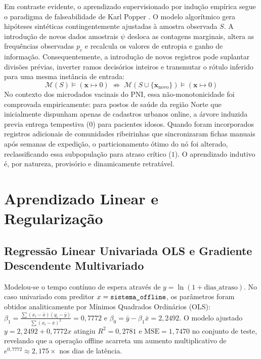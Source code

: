 \documentclass[12pt]{article}
\begin{document}
Em contraste evidente, o aprendizado supervisionado por indução empírica segue o paradigma de falseabilidade de Karl Popper \cite{popper1959}. O modelo algorítmico gera hipóteses sintéticas contingentemente ajustadas à amostra observada $S$. A introdução de novos dados amostrais $\psi$ desloca as contagens marginais, altera as frequências observadas $p_c$ e recalcula os valores de entropia e ganho de informação. Consequentemente, a introdução de novos registros pode suplantar divisões prévias, inverter ramos decisórios inteiros e transmutar o rótulo inferido para uma mesma instância de entrada:
\begin{equation}
\mathcal{M}(S) \models (\mathbf{x} \mapsto 0) \;\not\Longrightarrow\; \mathcal{M}(S \cup \{\mathbf{x}_{\text{novo}}\}) \models (\mathbf{x} \mapsto 0)
\end{equation}
No contexto dos microdados vacinais do PNI, essa não-monotonicidade foi comprovada empiricamente: para postos de saúde da região Norte que inicialmente dispunham apenas de cadastros urbanos online, a árvore induzida previa entrega tempestiva ($0$) para pacientes idosos. Quando foram incorporados registros adicionais de comunidades ribeirinhas que sincronizaram fichas manuais após semanas de expedição, o particionamento ótimo do nó foi alterado, reclassificando essa subpopulação para atraso crítico ($1$). O aprendizado indutivo é, por natureza, provisório e dinamicamente retratável.

\section{Aprendizado Linear e Regularização}

\subsection{Regressão Linear Univariada OLS e Gradiente Descendente Multivariado}

Modelou-se o tempo contínuo de espera através de $y = \ln(1 + \text{dias\_atraso})$. No caso univariado com preditor $x = \text{\texttt{sistema\_offline}}$, os parâmetros foram obtidos analiticamente por Mínimos Quadrados Ordinários (OLS): $\beta_1 = \frac{\sum (x_i - \bar{x})(y_i - \bar{y})}{\sum (x_i - \bar{x})^2} = 0,7772$ e $\beta_0 = \bar{y} - \beta_1 \bar{x} = 2,2492$. O modelo ajustado $y = 2,2492 + 0,7772 x$ atingiu $R^2 = 0,2781$ e $\text{MSE} = 1,7470$ no conjunto de teste, revelando que a operação offline acarreta um aumento multiplicativo de $e^{0,7772} \approx 2,175\times$ nos dias de latência.
\end{document}
